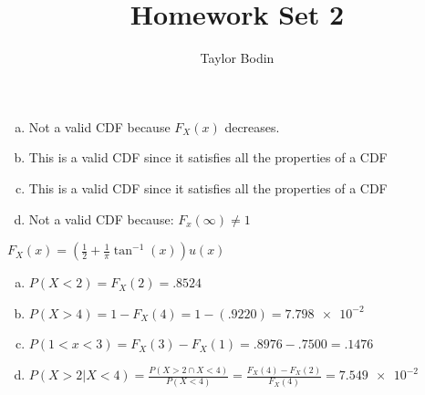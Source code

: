 \documentclass[12pt]{article}
\newenvironment{problem}[2][Problem]{\begin{trivlist}
\item[\hskip \labelsep {\bfseries #1}\hskip \labelsep {\bfseries #2.}]
  \vspace{1 cm}
}{\end{trivlist}}
\begin{document}
\title{Homework Set 2}
\author{Taylor Bodin}
\maketitle

\begin{problem}{3.1}
\item
  \begin{enumerate}[a.]
    \item %
      Not a valid CDF because $F_X(x)$ decreases.
    \item %
      This is a valid CDF since it satisfies all the properties of a CDF
    \item %
      This is a valid CDF since it satisfies all the properties of a CDF
    \item %
      Not a valid CDF because: $F_x(\infty) \neq 1$
  \end{enumerate}
\end{problem}

\begin{problem}{3.3}
\item
  $F_X(x) = \left(\frac{1}{2} + \frac{1}{\pi}\tan^{-1}(x)\right)u(x)$
  \begin{enumerate}[a.]
    \item %
      $P(X < 2) = F_X(2) = .8524$
    \item %
      $P(X>4) = 1-F_X(4) = 1 - (.9220) = \num{7.798e-2}$
    \item %
      $P(1<x<3) = F_X(3) - F_X(1) = .8976 - .7500 = .1476$
    \item %
      $P(X>2 | X<4) = \frac{P(X>2 \cap X<4)}{P(X<4)} = \frac{F_X(4)
      -F_X(2)}{F_X(4)} = \num{7.549e-2}$
  \end{enumerate} 
\end{problem}
\end{document}
